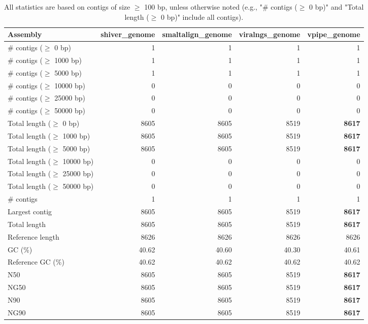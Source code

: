 \documentclass[12pt,a4paper]{article}
\begin{document}
\begin{table}[ht]
\begin{center}
\caption{All statistics are based on contigs of size $\geq$ 100 bp, unless otherwise noted (e.g., "\# contigs ($\geq$ 0 bp)" and "Total length ($\geq$ 0 bp)" include all contigs).}
\begin{tabular}{|l*{4}{|r}|}
\hline
Assembly & shiver\_genome & smaltalign\_genome & viralngs\_genome & vpipe\_genome \\ \hline
\# contigs ($\geq$ 0 bp) & 1 & 1 & 1 & 1 \\ \hline
\# contigs ($\geq$ 1000 bp) & 1 & 1 & 1 & 1 \\ \hline
\# contigs ($\geq$ 5000 bp) & 1 & 1 & 1 & 1 \\ \hline
\# contigs ($\geq$ 10000 bp) & 0 & 0 & 0 & 0 \\ \hline
\# contigs ($\geq$ 25000 bp) & 0 & 0 & 0 & 0 \\ \hline
\# contigs ($\geq$ 50000 bp) & 0 & 0 & 0 & 0 \\ \hline
Total length ($\geq$ 0 bp) & 8605 & 8605 & 8519 & {\bf 8617} \\ \hline
Total length ($\geq$ 1000 bp) & 8605 & 8605 & 8519 & {\bf 8617} \\ \hline
Total length ($\geq$ 5000 bp) & 8605 & 8605 & 8519 & {\bf 8617} \\ \hline
Total length ($\geq$ 10000 bp) & 0 & 0 & 0 & 0 \\ \hline
Total length ($\geq$ 25000 bp) & 0 & 0 & 0 & 0 \\ \hline
Total length ($\geq$ 50000 bp) & 0 & 0 & 0 & 0 \\ \hline
\# contigs & 1 & 1 & 1 & 1 \\ \hline
Largest contig & 8605 & 8605 & 8519 & {\bf 8617} \\ \hline
Total length & 8605 & 8605 & 8519 & {\bf 8617} \\ \hline
Reference length & 8626 & 8626 & 8626 & 8626 \\ \hline
GC (\%) & 40.62 & 40.60 & 40.30 & 40.61 \\ \hline
Reference GC (\%) & 40.62 & 40.62 & 40.62 & 40.62 \\ \hline
N50 & 8605 & 8605 & 8519 & {\bf 8617} \\ \hline
NG50 & 8605 & 8605 & 8519 & {\bf 8617} \\ \hline
N90 & 8605 & 8605 & 8519 & {\bf 8617} \\ \hline
NG90 & 8605 & 8605 & 8519 & {\bf 8617} \\ \hline

\end{tabular}
\end{center}
\end{table}
\end{document}
